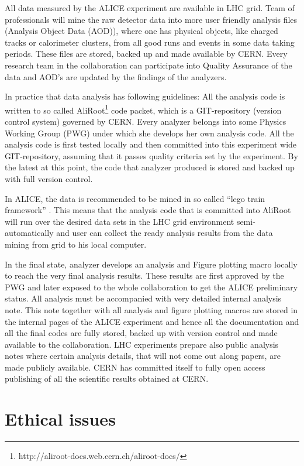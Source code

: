 All data measured by the ALICE experiment are available in LHC grid. Team of professionals will mine the raw detector data into more user friendly analysis files (Analysis Object Data (AOD)), where one has physical objects, like charged tracks or calorimeter clusters, from all good runs and events in some data taking periods. These files are stored, backed up and made available by CERN. Every research team in the collaboration can participate into Quality Assurance of the data and AOD's are updated by the findings of the analyzers.

In practice that data analysis has following guidelines: All the analysis code is written to so called AliRoot\footnote{http://aliroot-docs.web.cern.ch/aliroot-docs/} code packet, which is a GIT-repository (version control system) governed by CERN. Every analyzer belongs into some Physics Working Group (PWG) under which she develops her own analysis code. All the analysis code is first tested locally and then committed into this experiment wide GIT-repository, assuming that it passes quality criteria set by the experiment. By the latest at this point, the code that analyzer produced is stored and backed up with full version control. 

In ALICE, the data is recommended to be mined in so called ``lego train framework'' \cite{Zimmermann:2015owa}. This means that the analysis code that is committed into AliRoot will run over the desired data sets in the LHC grid environment semi-automatically and user can collect the ready analysis results from the data mining from grid to his local computer.

In the final state, analyzer develops an analysis and Figure plotting macro locally to reach the very final analysis results. These results are first approved by the PWG and later exposed to the whole collaboration to get the ALICE preliminary status. All analysis must be accompanied with very detailed internal analysis note. This note together with all analysis and figure plotting macros are stored in the internal pages of the ALICE experiment and hence all the documentation and all the final codes are fully stored, backed up with version control and made available to the collaboration. LHC experiments prepare also public analysis notes where certain analysis details, that will not come out along papers, are made publicly available. CERN has committed itself to fully open access publishing of all the scientific results obtained at CERN.

\section{Ethical issues}

